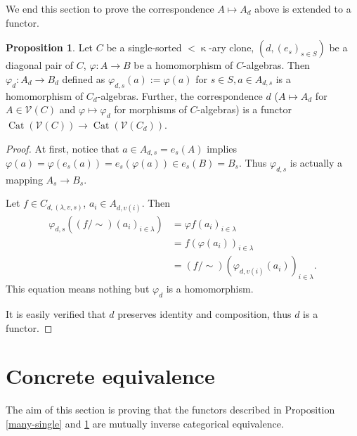 \documentclass[a4paper,10pt]{article}
\theoremstyle{definition}
\newtheorem{cor}[df]{Corollary}
\newtheorem{prop}[df]{Proposition}
\newcommand\ph{\varphi}
\newcommand\ra{\rightarrow}
\newcommand\mc{\mathclose}
\newcommand\V{\mathcal{V}}
\DeclareMathOperator{\Cat}{Cat}
\begin{document}
We end this section to prove the correspondence $A\mapsto A_d$ above is extended to a functor.
\begin{prop}\label{single-many}
Let $C$ be a single-sorted $<\mc\kappa$-ary clone, 
$(d,(e_s)_{s\in S})$ be a diagonal pair of $C$, $\ph:A\ra B$ be a homomorphism of $C$-algebras.
Then $\ph_d:A_d\ra B_d$ defined as $\ph_{d,s}(a):=\ph(a)$ for $s\in S,a\in A_{d,s}$
is a homomorphism of $C_d$-algebras.
Further, the correspondence $d$ ($A\mapsto A_d$ for $A\in\V(C)$ and
$\ph\mapsto \ph_d$ for morphisms of $C$-algebras) is a functor
$\Cat(\V(C))\ra \Cat(\V(C_d))$.
\end{prop}
\begin{proof}
At first, notice that $a\in A_{d,s}=e_s(A)$ implies
$\ph(a)=\ph(e_s(a))=e_s(\ph(a))\in e_s(B)=B_s$.
Thus $\ph_{d,s}$ is actually a mapping $A_s\ra B_s$.

Let $f\in C_{d,(\lambda,v,s)}$, $a_i\in A_{d,v(i)}$.
Then
\begin{align*}
\ph_{d,s}((f/\mc\sim)(a_i)_{i\in\lambda})
&=\ph f(a_i)_{i\in\lambda}\\
&=f(\ph (a_i))_{i\in\lambda}\\
&=(f/\mc\sim)(\ph_{d,v(i)} (a_i))_{i\in\lambda}.
\end{align*}
This equation means nothing but $\ph_d$ is a homomorphism.

It is easily verified that $d$ preserves identity and composition,
thus $d$ is a functor.
\end{proof}

\section{Concrete equivalence} \label{s-conrete-equivalence}

The aim of this section is proving that the functors described in 
Proposition \ref{many-single} and \ref{single-many} are
mutually inverse categorical equivalence.
\end{document}
